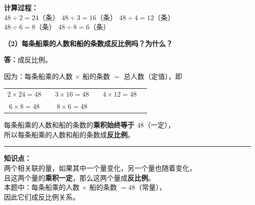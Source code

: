 \documentclass[12pt, a4paper]{ctexrep}
\begin{document}
\vspace{0.4cm}

{
\small\color{gray}
\textbf{计算过程：}\\
$48 \div 2 = 24$（条）\quad
$48 \div 3 = 16$（条）\quad
$48 \div 4 = 12$（条）\\
$48 \div 6 = 8$（条）\quad\;
$48 \div 8 = 6$（条）
}

\vspace{1cm}

\noindent\textbf{（2）每条船乘的人数和船的条数成反比例吗？为什么？}

\vspace{0.4cm}

\noindent
\textbf{答：}成反比例。

\vspace{0.3cm}

\noindent
因为：每条船乘的人数 $\times$ 船的条数 $=$ 总人数（定值），即

\vspace{0.2cm}

\begin{center}
\renewcommand{\arraystretch}{1.6}
\begin{tabular}{cccccc}
$2 \times 24 = 48$ & \quad &
$3 \times 16 = 48$ & \quad &
$4 \times 12 = 48$ \\[4pt]
$6 \times 8 = 48$ & \quad &
$8 \times 6 = 48$ & & \\
\end{tabular}
\end{center}

\vspace{0.3cm}

\noindent
每条船乘的人数和船的条数的\textbf{乘积始终等于 $48$}（一定），\\[4pt]
所以每条船乘的人数和船的条数成\textbf{\textcolor{red!70!black}{反比例}}。

\vspace{1cm}
\hrule
\vspace{0.4cm}

{\small\color{gray}
\textbf{知识点：}\\
两个相关联的量，如果其中一个量变化，另一个量也随着变化，\\
且这两个量的\textbf{乘积一定}，那么这两个量成\textbf{反比例}。\\
本题中：每条船乘的人数 $\times$ 船的条数 $= 48$（常量），\\
因此它们成反比例关系。
}


\newpage
\end{document}
